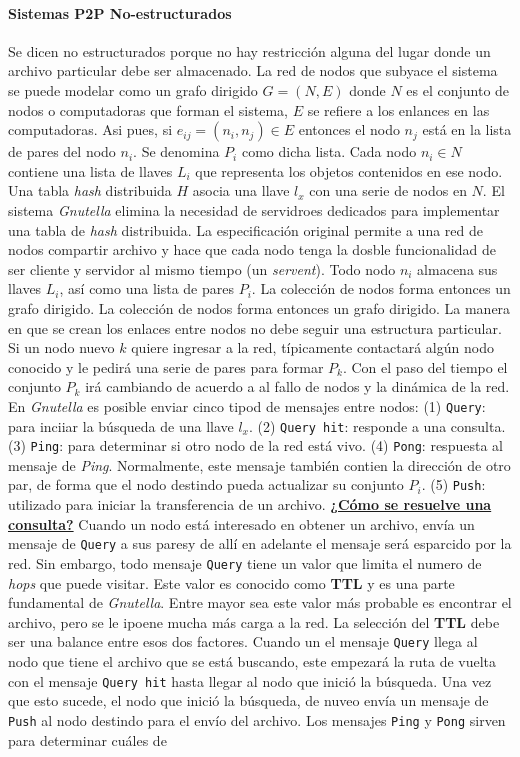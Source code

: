 \paragraph{\textnormal{\textbf{Sistemas P2P No-estructurados}}}
Se dicen no estructurados porque no hay restricción alguna del lugar donde un archivo particular debe ser almacenado. La red de nodos que subyace el sistema se puede modelar como un grafo dirigido $G = (N, E)$ donde $N$ es el conjunto de nodos o computadoras que forman el sistema, $E$ se refiere a los enlances en las computadoras. Asi pues, si $e_{ij} = (n_i, n_j) \in E$ entonces el nodo $n_j$ está en la lista de pares del nodo $n_i$. Se denomina $P_i$ como dicha lista. Cada nodo $n_i \in N$ contiene una lista de llaves $L_i$ que representa los objetos contenidos en ese nodo. Una tabla \emph{hash} distribuida $H$ asocia una llave $l_x$ con una serie de nodos en $N$. El sistema \emph{Gnutella} elimina la necesidad de servidroes dedicados para implementar una tabla de \emph{hash} distribuida. La especificación original permite a una red de nodos compartir archivo y hace que cada nodo tenga la dosble funcionalidad de ser cliente y servidor al mismo tiempo (un \emph{servent}). Todo nodo $n_i$ almacena sus llaves $L_i$, así como una lista de pares $P_i$. La colección de nodos forma entonces un grafo dirigido. La colección de nodos forma entonces un grafo dirigido. La manera en que se crean los enlaces entre nodos no debe seguir una estructura particular. Si un nodo nuevo $k$ quiere ingresar a la red, típicamente contactará algún nodo conocido y le pedirá una serie de pares para formar $P_k$. Con el paso del tiempo el conjunto $P_k$ irá cambiando de acuerdo a al fallo de nodos y la dinámica de la red. En \emph{Gnutella} es posible enviar cinco tipod de mensajes entre nodos: (1) \texttt{Query}: para inciiar la búsqueda de una llave $l_x$. (2) \texttt{Query hit}: responde a una consulta. (3) \texttt{Ping}: para determinar si otro nodo de la red está vivo. (4) \texttt{Pong}: respuesta al mensaje de \emph{Ping}. Normalmente, este mensaje también contien la dirección de otro par, de forma que el nodo destindo pueda actualizar su conjunto $P_i$. (5) \texttt{Push}: utilizado para iniciar la transferencia de un archivo. \underline{\textbf{¿Cómo se resuelve una consulta?}} Cuando un nodo está interesado en obtener un archivo, envía un mensaje de \texttt{Query} a sus paresy de allí en adelante el mensaje será esparcido por la red. Sin embargo, todo mensaje \texttt{Query} tiene un valor que limita el numero de \emph{hops} que puede visitar. Este valor es conocido como \textbf{TTL} y es una parte fundamental de \emph{Gnutella}. Entre mayor sea este valor más probable es encontrar el archivo, pero se le ipoene mucha más carga a la red. La selección del \textbf{TTL} debe ser una balance entre esos dos factores. Cuando un el mensaje \texttt{Query} llega al nodo que tiene el archivo que se está buscando, este empezará la ruta de vuelta con el mensaje \texttt{Query hit} hasta llegar al nodo que inició la búsqueda. Una vez que esto sucede, el nodo que inició la búsqueda, de nuveo envía un mensaje de \texttt{Push} al nodo destindo para el envío del archivo. Los mensajes \texttt{Ping} y \texttt{Pong} sirven para determinar cuáles de 